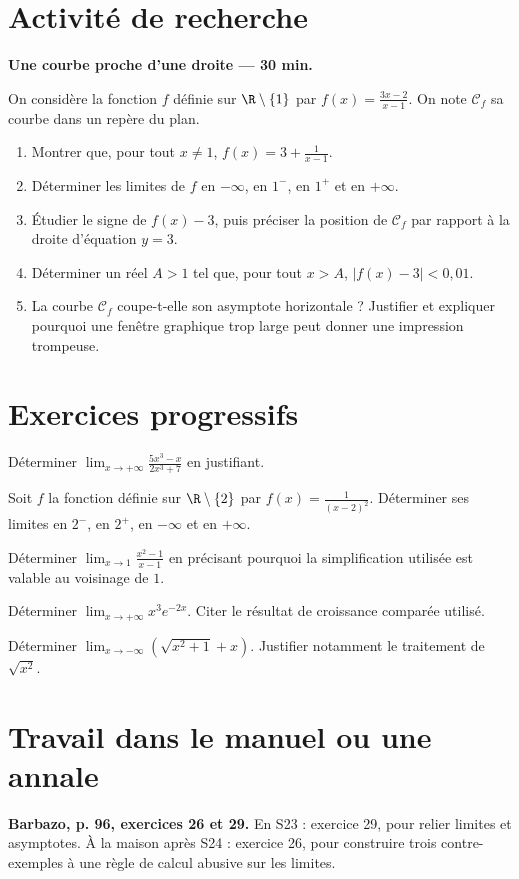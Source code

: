 \section{Activité de recherche}\textbf{Une courbe proche d'une droite --- 30 min.}\par On considère la fonction $f$ définie sur $\R\setminus\{1\}$ par $f(x)=\frac{3x-2}{x-1}$. On note $\mathcal C_f$ sa courbe dans un repère du plan.
\begin{enumerate}\item Montrer que, pour tout $x\ne1$, $f(x)=3+\frac1{x-1}$.
\item Déterminer les limites de $f$ en $-\infty$, en $1^-$, en $1^+$ et en $+\infty$.
\item Étudier le signe de $f(x)-3$, puis préciser la position de $\mathcal C_f$ par rapport à la droite d'équation $y=3$.
\item Déterminer un réel $A>1$ tel que, pour tout $x>A$, $|f(x)-3|<0{,}01$.
\item La courbe $\mathcal C_f$ coupe-t-elle son asymptote horizontale ? Justifier et expliquer pourquoi une fenêtre graphique trop large peut donner une impression trompeuse.\end{enumerate}

\section{Exercices progressifs}

Déterminer $\displaystyle\lim_{x\to+\infty}\frac{5x^3-x}{2x^3+7}$ en justifiant.

Soit $f$ la fonction définie sur $\R\setminus\{2\}$ par $f(x)=\frac1{(x-2)^2}$. Déterminer ses limites en $2^-$, en $2^+$, en $-\infty$ et en $+\infty$.

Déterminer $\displaystyle\lim_{x\to1}\frac{x^2-1}{x-1}$ en précisant pourquoi la simplification utilisée est valable au voisinage de $1$.

Déterminer $\displaystyle\lim_{x\to+\infty}x^3e^{-2x}$. Citer le résultat de croissance comparée utilisé.

Déterminer $\displaystyle\lim_{x\to-\infty}\left(\sqrt{x^2+1}+x\right)$. Justifier notamment le traitement de $\sqrt{x^2}$.

\section{Travail dans le manuel ou une annale}\textbf{Barbazo, p. 96, exercices 26 et 29.} En S23 : exercice 29, pour relier limites et asymptotes. À la maison après S24 : exercice 26, pour construire trois contre-exemples à une règle de calcul abusive sur les limites.

